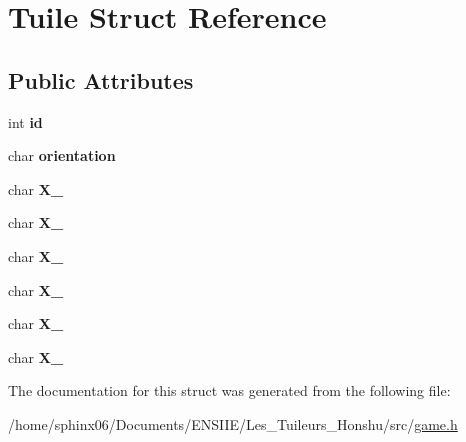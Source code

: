 \hypertarget{structTuile}{}\section{Tuile Struct Reference}
\label{structTuile}
\subsection*{Public Attributes}
\begin{DoxyCompactItemize}
\item 
\mbox{\label{structTuile_a45754810cef2273dd533138572fd69d3}} 
int {\bfseries id}
\item 
\mbox{\label{structTuile_a35df68a87931e7230087f43452f2636b}} 
char {\bfseries orientation}
\item 
\mbox{\label{structTuile_a33d2a0d532346421afa9a2a90c254a0c}} 
char {\bfseries X\+\_}
\item 
\mbox{\label{structTuile_a41e9a4c908d5ee5ab73c41d1d80901bd}} 
char {\bfseries X\+\_}
\item 
\mbox{\label{structTuile_a3e98f6d39d1b6a2a058e49ee1b834d30}} 
char {\bfseries X\+\_}
\item 
\mbox{\label{structTuile_ac4a02540c448a7162c9c079ae89a9f44}} 
char {\bfseries X\+\_}
\item 
\mbox{\label{structTuile_a000249e10ae9e530221a112bd64c923c}} 
char {\bfseries X\+\_}
\item 
\mbox{\label{structTuile_aefe1f935f40ff71bb9d2c0effd46e1a7}} 
char {\bfseries X\+\_}
\end{DoxyCompactItemize}


The documentation for this struct was generated from the following file\+:\begin{DoxyCompactItemize}
\item 
/home/sphinx06/\+Documents/\+E\+N\+S\+I\+I\+E/\+Les\+\_\+\+Tuileurs\+\_\+\+Honshu/src/\hyperlink{game_8h}{game.\+h}\end{DoxyCompactItemize}
